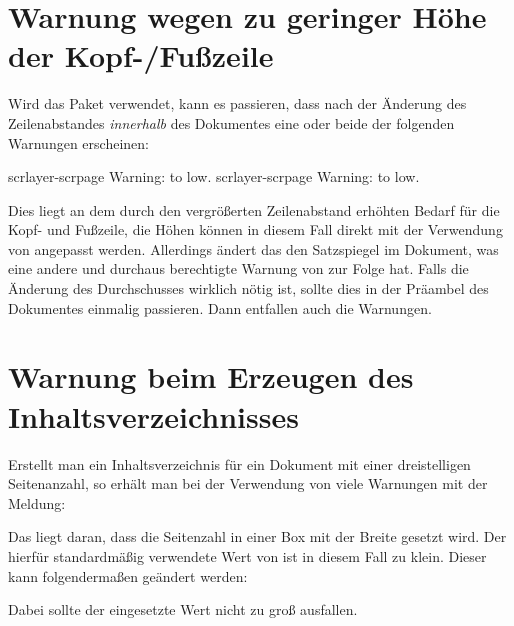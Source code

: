 \section{Warnung wegen zu geringer Höhe der Kopf-/Fußzeile}
\label{sec:tips:headline}
Wird das Paket  verwendet, kann es passieren, dass nach der 
Änderung des Zeilenabstandes \emph{innerhalb} des Dokumentes eine oder beide 
der folgenden Warnungen erscheinen:
%
\begin{quoting}
\begin{Code}
scrlayer-scrpage Warning: \headheight to low.
scrlayer-scrpage Warning: \footheight to low.
\end{Code}
\end{quoting}
%
Dies liegt an dem durch den vergrößerten Zeilenabstand erhöhten Bedarf für die
Kopf- und Fußzeile, die Höhen können in diesem Fall direkt mit der Verwendung 
von  angepasst werden. Allerdings ändert das den 
Satzspiegel im Dokument, was eine andere und durchaus berechtigte Warnung von 
 zur Folge hat. Falls die Änderung des Durchschusses wirklich 
nötig ist, sollte dies in der Präambel des Dokumentes einmalig passieren. Dann 
entfallen auch die Warnungen.



\section{Warnung beim Erzeugen des Inhaltsverzeichnisses}
%
%
Erstellt man ein Inhaltsverzeichnis für ein Dokument mit einer dreistelligen 
Seitenanzahl, so erhält man bei der Verwendung von  
viele Warnungen mit der Meldung:
%
\begin{quoting}
\end{quoting}
%
Das liegt daran, dass die Seitenzahl in einer Box mit der Breite 
 gesetzt wird. Der hierfür standardmäßig verwendete Wert von 
\PValue{1.55em} ist in diesem Fall zu klein. Dieser kann folgendermaßen 
geändert werden:
%
\begin{quoting}
\begin{Code}
\makeatletter
\renewcommand*\@pnumwidth{1.7em}
\makeatother
\end{Code}
\end{quoting}
%
Dabei sollte der eingesetzte Wert nicht zu groß ausfallen.



